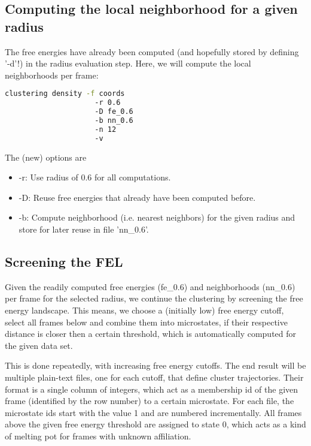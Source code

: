 \documentclass[12pt,a4paper,twoside,english,fleqn]{article}
\begin{document}
\subsection{Computing the local neighborhood for a given radius}
The free energies have already been computed (and hopefully stored by defining '-d'!) in the radius evaluation step.
Here, we will compute the local neighborhoods per frame:
\begin{lstlisting}[language=bash,basicstyle=\ttfamily]
  clustering density -f coords
                     -r 0.6
                     -D fe_0.6
                     -b nn_0.6
                     -n 12
                     -v
\end{lstlisting}
The (new) options are
\begin{itemize}
  \item -r: Use radius of 0.6 for all computations.
  \item -D: Reuse free energies that already have been computed before.
  \item -b: Compute neighborhood (i.e. nearest neighbors) for the given
            radius and store for later reuse in file 'nn\_0.6'.
\end{itemize}

\subsection{Screening the FEL\label{sec:screening}}
Given the readily computed free energies (fe\_0.6) and neighborhoods (nn\_0.6) per frame for the selected radius,
we continue the clustering by screening the free energy landscape.
This means, we choose a (initially low) free energy cutoff, select all frames below and combine them into
microstates, if their respective distance is closer then a certain threshold, which is automatically computed for the given data set.

This is done repeatedly, with increasing free energy cutoffs.
The end result will be multiple plain-text files, one for each cutoff, that define cluster trajectories.
Their format is a single column of integers, which act as a membership id of the given frame (identified by the row number) to
a certain microstate.
For each file, the microstate ids start with the value 1 and are numbered incrementally.
All frames above the given free energy threshold are assigned to state 0, which acts as a kind of melting pot for frames with unknown affiliation.
\end{document}
